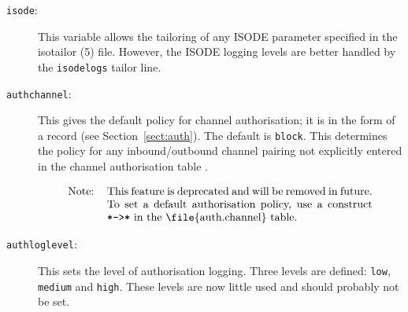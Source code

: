 \begin{description}

\item[\verb+isode+:]
This variable allows the tailoring of any ISODE parameter specified in
the {\man isotailor (5)} file. However, the ISODE logging levels are
better handled by the \verb+isodelogs+ tailor line.

\item[\verb+authchannel+:]
This gives the default policy for channel authorisation; it is in the
form of a  record (see Section~\ref{sect:auth}).
The default is
\verb+block+.  This determines the policy for any inbound/outbound
channel pairing not explicitly entered in the channel authorisation
table .

\[\begin{tabular}{l p{0.7\textwidth}}
Note:& This feature is deprecated and will be removed in future. To
set a default authorisation policy, use a construct \verb|*->*| in the
\file{auth.channel} table.
\end{tabular}\]

\item[\verb+authloglevel+:]
This sets the level of authorisation logging.  Three levels are defined:
\verb|low|, \verb|medium| and \verb|high|. These levels are now little
used and should probably not be set.


\end{description}
